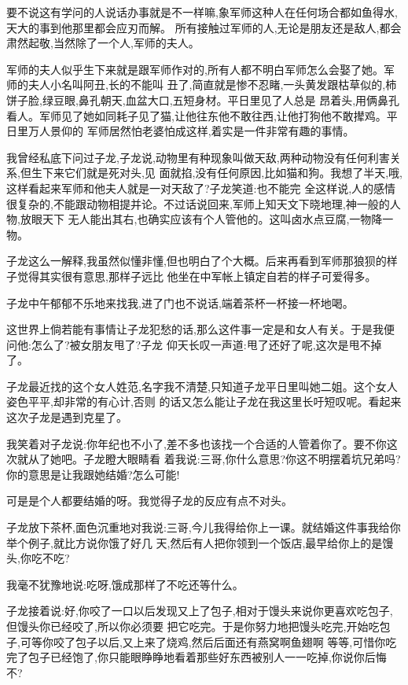 ﻿\documentclass[12pt,twocolumn]{article}
\begin{document}
要不说这有学问的人说话办事就是不一样嘛,象军师这种人在任何场合都如鱼得水,天大的事到他那里都会应刃而解。
所有接触过军师的人,无论是朋友还是敌人,都会肃然起敬,当然除了一个人,军师的夫人。

军师的夫人似乎生下来就是跟军师作对的,所有人都不明白军师怎么会娶了她。军师的夫人小名叫阿丑,长的不能叫
丑了,简直就是惨不忍睹,一头黄发跟枯草似的,柿饼子脸,绿豆眼,鼻孔朝天,血盆大口,五短身材。平日里见了人总是
昂着头,用俩鼻孔看人。军师见了她如同耗子见了猫,让他往东他不敢往西,让他打狗他不敢撵鸡。平日里万人景仰的
军师居然怕老婆怕成这样,着实是一件非常有趣的事情。

我曾经私底下问过子龙,子龙说,动物里有种现象叫做天敌,两种动物没有任何利害关系,但生下来它们就是死对头,见
面就掐,没有任何原因,比如猫和狗。我想了半天,哦,这样看起来军师和他夫人就是一对天敌了?子龙笑道:也不能完
全这样说,人的感情很复杂的,不能跟动物相提并论。不过话说回来,军师上知天文下晓地理,神一般的人物,放眼天下
无人能出其右,也确实应该有个人管他的。这叫卤水点豆腐,一物降一物。

子龙这么一解释,我虽然似懂非懂,但也明白了个大概。后来再看到军师那狼狈的样子觉得其实很有意思,那样子远比
他坐在中军帐上镇定自若的样子可爱得多。

子龙中午郁郁不乐地来找我,进了门也不说话,端着茶杯一杯接一杯地喝。

这世界上倘若能有事情让子龙犯愁的话,那么这件事一定是和女人有关。于是我便问他:怎么了?被女朋友甩了?子龙
仰天长叹一声道:甩了还好了呢,这次是甩不掉了。

子龙最近找的这个女人姓范,名字我不清楚,只知道子龙平日里叫她二姐。这个女人姿色平平,却非常的有心计,否则
的话又怎么能让子龙在我这里长吁短叹呢。看起来这次子龙是遇到克星了。

我笑着对子龙说:你年纪也不小了,差不多也该找一个合适的人管着你了。要不你这次就从了她吧。子龙瞪大眼睛看
着我说:三哥,你什么意思?你这不明摆着坑兄弟吗?你的意思是让我跟她结婚?怎么可能!

可是是个人都要结婚的呀。我觉得子龙的反应有点不对头。

子龙放下茶杯,面色沉重地对我说:三哥,今儿我得给你上一课。就结婚这件事我给你举个例子,就比方说你饿了好几
天,然后有人把你领到一个饭店,最早给你上的是馒头,你吃不吃?

我毫不犹豫地说:吃呀,饿成那样了不吃还等什么。

子龙接着说:好,你咬了一口以后发现又上了包子,相对于馒头来说你更喜欢吃包子,但馒头你已经咬了,所以你必须要
把它吃完。于是你努力地把馒头吃完,开始吃包子,可等你咬了包子以后,又上来了烧鸡,然后后面还有燕窝啊鱼翅啊
等等,可惜你吃完了包子已经饱了,你只能眼睁睁地看着那些好东西被别人一一吃掉,你说你后悔不?
\end{document}
